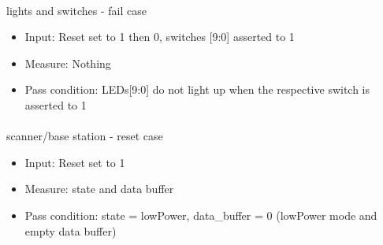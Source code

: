 \documentclass{article}
\begin{document}
    \paragraph{} lights and switches - fail case
    \begin{itemize}
      \item Input: Reset set to 1 then 0, switches [9:0] asserted to 1
      \item Measure: Nothing
      \item Pass condition: LEDs[9:0] do not light up when the respective switch is asserted to 1
    \end{itemize}

    \paragraph{} scanner/base station - reset case
    \begin{itemize}
      \item Input: Reset set to 1
      \item Measure: state and data buffer
      \item Pass condition: state = lowPower, data\_buffer = 0 (lowPower mode and empty data buffer)
    \end{itemize}
\end{document}
